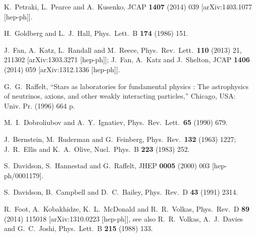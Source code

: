 \documentclass[12pt]{article}
\begin{document}
{{\begin{thebibliography}{999}
  K.~Petraki, L.~Pearce and A.~Kusenko,
  JCAP {\bf 1407} (2014) 039
  [arXiv:1403.1077 [hep-ph]].
  
  H.~Goldberg and L.~J.~Hall,
  Phys.\ Lett.\ B {\bf 174} (1986) 151.
  
  J.~Fan, A.~Katz, L.~Randall and M.~Reece,
  Phys.\ Rev.\ Lett.\  {\bf 110} (2013) 21,  211302
  [arXiv:1303.3271 [hep-ph]];
  J.~Fan, A.~Katz and J.~Shelton,
  JCAP {\bf 1406} (2014) 059
  [arXiv:1312.1336 [hep-ph]].

  G.~G.~Raffelt,
  ``Stars as laboratories for fundamental physics : The astrophysics of neutrinos, axions, and other weakly interacting particles,''
  Chicago, USA: Univ. Pr. (1996) 664 p.

  M.~I.~Dobroliubov and A.~Y.~Ignatiev,
  Phys.\ Rev.\ Lett.\  {\bf 65} (1990) 679.
  
  J.~Bernstein, M.~Ruderman and G.~Feinberg,
  Phys.\ Rev.\  {\bf 132} (1963) 1227;
  J.~R.~Ellis and K.~A.~Olive,
  Nucl.\ Phys.\ B {\bf 223} (1983) 252.

  S.~Davidson, S.~Hannestad and G.~Raffelt,
  JHEP {\bf 0005} (2000) 003
  [hep-ph/0001179].
  
  S.~Davidson, B.~Campbell and D.~C.~Bailey,
  Phys.\ Rev.\ D {\bf 43} (1991) 2314.
  
  R.~Foot, A.~Kobakhidze, K.~L.~McDonald and R.~R.~Volkas,
  Phys.\ Rev.\ D {\bf 89} (2014) 115018
  [arXiv:1310.0223 [hep-ph]],
  see also
  R.~R.~Volkas, A.~J.~Davies and G.~C.~Joshi,
  Phys.\ Lett.\ B {\bf 215} (1988) 133.
  

\end{thebibliography}}}
\end{document}
